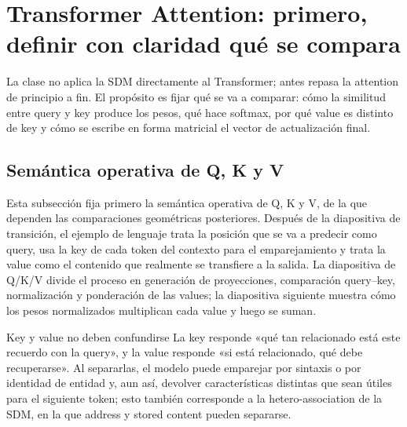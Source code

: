 \section{Transformer Attention: primero, definir con claridad qué se compara}

La clase no aplica la SDM directamente al Transformer; antes repasa la attention de principio a fin. El propósito es fijar qué se va a comparar: cómo la similitud entre query y key produce los pesos, qué hace softmax, por qué value es distinto de key y cómo se escribe en forma matricial el vector de actualización final.

\subsection{Semántica operativa de Q, K y V}

Esta subsección fija primero la semántica operativa de Q, K y V, de la que dependen las comparaciones geométricas posteriores. Después de la diapositiva de transición, el ejemplo de lenguaje trata la posición que se va a predecir como query, usa la key de cada token del contexto para el emparejamiento y trata la value como el contenido que realmente se transfiere a la salida. La diapositiva de Q/K/V divide el proceso en generación de proyecciones, comparación query--key, normalización y ponderación de las values; la diapositiva siguiente muestra cómo los pesos normalizados multiplican cada value y luego se suman.





\begin{importantbox}{Key y value no deben confundirse}
La key responde «qué tan relacionado está este recuerdo con la query», y la value responde «si está relacionado, qué debe recuperarse». Al separarlas, el modelo puede emparejar por sintaxis o por identidad de entidad y, aun así, devolver características distintas que sean útiles para el siguiente token; esto también corresponde a la hetero-association de la SDM, en la que address y stored content pueden separarse.
\end{importantbox}

